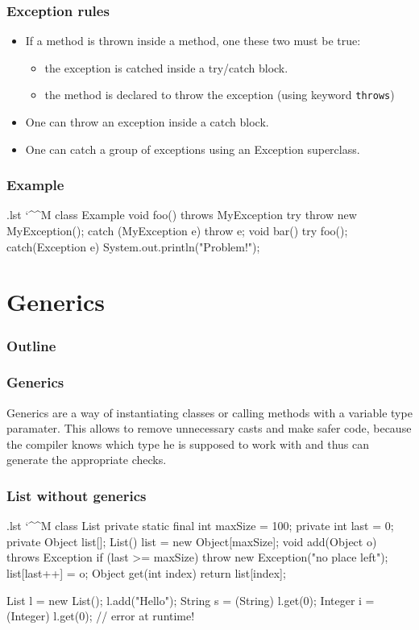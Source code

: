 \documentclass[10pt]{beamer}
\makeatletter
\newenvironment{code}{%
  \begingroup
  \@bsphack
  \immediate\openout\lstvrb@out\jobname.lst
  \let\do\@makeother\dospecials\catcode`\^^M\active
  \def\verbatim@processline{%
    \immediate\write\lstvrb@out{\the\verbatim@line}}%
  \verbatim@start}{%
  \immediate\closeout\lstvrb@out
  \@esphack
  \endgroup

  \begin{alertblock}{}
    
  \end{alertblock}}
\makeatother
\begin{document}
\begin{frame}[fragile]
\frametitle{Exception rules}
\begin{itemize}
  \item If a method is thrown inside a method, one these two must be true:
  \begin{itemize}
    \item the exception is catched inside a try/catch block.
    \item the method is declared to throw the exception (using keyword \verb!throws!)
  \end{itemize}
  \item One can throw an exception inside a catch block.
  \item One can catch a group of exceptions using an Exception superclass.
\end{itemize}
\end{frame}

\begin{frame}[fragile]
\frametitle{Example}
\begin{code}
  class Example {
    void foo() throws MyException {
      try {
        throw new MyException();
      } catch (MyException e) {
        throw e;
      }
    }
    void bar() {
      try {
        foo();
      } catch(Exception e) {
        System.out.println("Problem!");
      }
    }
  }
\end{code}
\end{frame}

\section{Generics}
\begin{frame}
  \frametitle{Outline}
  \tableofcontents
\end{frame}

\begin{frame}[fragile]
\frametitle{Generics}
\begin{definition}
Generics are a way of instantiating classes or calling methods with a variable type paramater.
This allows to remove unnecessary casts and make safer code, because the compiler knows which type he
is supposed to work with and thus can generate the appropriate checks.
\end{definition}
\end{frame}

\begin{frame}
\frametitle{List without generics}
\begin{code}
  class List {
    private static final int maxSize = 100;
    private int last = 0;
    private Object list[];
    List() {
      list = new Object[maxSize];
    }
    void add(Object o) throws Exception{
      if (last >= maxSize)
        throw new Exception("no place left");
      list[last++] = o;
    }
    Object get(int index) {
      return list[index];
    }
  }

  List l = new List();
  l.add("Hello");
  String s = (String) l.get(0);
  Integer i = (Integer) l.get(0); // error at runtime!
\end{code}
\end{frame}
\end{document}
